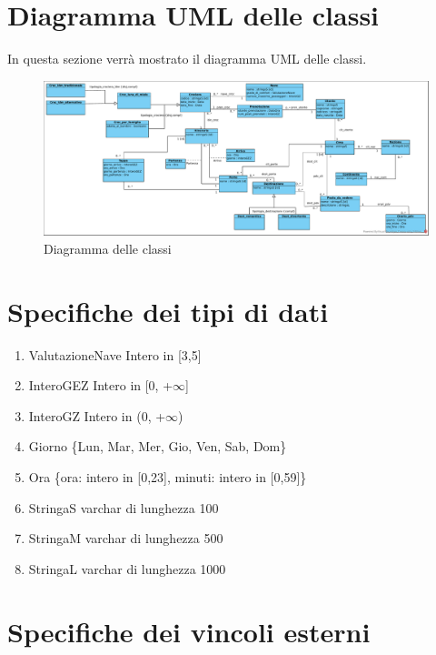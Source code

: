 \documentclass{article}
\begin{document}
\section{Diagramma UML delle classi}

In questa sezione verrà mostrato il diagramma UML delle classi.
\begin{figure}[h]
    \centering
    \includegraphics[width=\textwidth]{../Diagramma delle classi.pdf}
    \caption{Diagramma delle classi}
\end{figure}

\section{Specifiche dei tipi di dati}

\begin{enumerate}
    \item ValutazioneNave Intero in [3,5]
    \item InteroGEZ Intero in [0, +$\infty$]
    \item InteroGZ Intero in (0, +$\infty$)
    \item Giorno \{Lun, Mar, Mer, Gio, Ven, Sab, Dom\}
    \item Ora \{ora: intero in [0,23], minuti: intero in [0,59]\}
    \item StringaS varchar di lunghezza 100
    \item StringaM varchar di lunghezza 500
    \item StringaL varchar di lunghezza 1000
\end{enumerate}



\section{Specifiche dei vincoli esterni}
\end{document}

